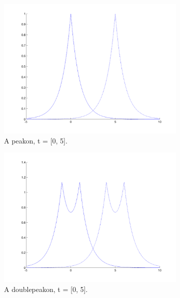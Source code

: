 \begin{figure}[h]
        \centering
        \begin{subfigure}[b]{0.49\textwidth}
                \includegraphics[width=\textwidth]{gfx/peakon}
                \caption{A peakon, t = [0, 5].}
                \label{fig:peakon}
        \end{subfigure}
        \begin{subfigure}[b]{0.49\textwidth}
                \includegraphics[width=\textwidth]{gfx/doublepeakon}
                \caption{A doublepeakon, t = [0, 5].}
                \label{fig:doublepeakon}
        \end{subfigure}
        \begin{subfigure}[b]{0.49\textwidth}

\end{subfigure}
\end{figure}
